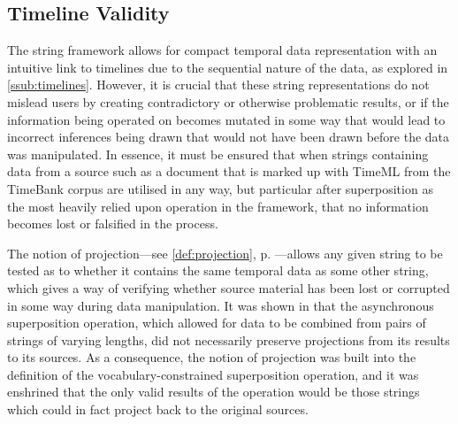 \documentclass[a4paper,12pt,leqno]{article}
\begin{document}
\subsection{Timeline Validity}\label{sub:validity}
The string framework allows for compact temporal data representation with an intuitive link to timelines due to the sequential nature of the data, as explored in \cref{ssub:timelines}. However, it is crucial that these string representations do not mislead users by creating contradictory or otherwise problematic results, or if the information being operated on becomes mutated in some way that would lead to incorrect inferences being drawn that would not have been drawn before the data was manipulated. In essence, it must be ensured that when strings containing data from a source such as a document that is marked up with TimeML from the TimeBank corpus are utilised in any way, but particular after superposition as the most heavily relied upon operation in the framework, that no information becomes lost or falsified in the process.

The notion of projection---see \cref{def:projection}, p. \pageref{def:projection}---allows any given string to be tested as to whether it contains the same temporal data as some other string, which gives a way of verifying whether source material has been lost or corrupted in some way during data manipulation. It was shown in  that the asynchronous superposition operation, which allowed for data to be combined from pairs of strings of varying lengths, did not necessarily preserve projections from its results to its sources. As a consequence, the notion of projection was built into the definition of the vocabulary-constrained superposition operation, and it was enshrined that the only valid results of the operation would be those strings which could in fact project back to the original sources.
\end{document}
